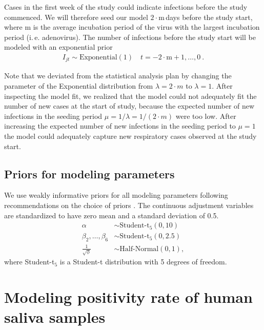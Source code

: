 \documentclass[fleqn,11pt]{wlscirep_supp}
\newcommand\ie{i.\,e.\xspace}
\begin{document}
Cases in the first week of the study could indicate infections before the study commenced. We will therefore seed our model $2 \cdot \text{m}\,$days before the study start, where $\text{m}$ is the average incubation period of the virus with the largest incubation period (\ie adenovirus). The number of infections before the study start will be modeled with an exponential prior
\begin{align*}
    I_{jt} \sim \text{Exponential}(1) \quad t = -2\cdot\text{m}+1, \dots, 0~. 
\end{align*}

Note that we deviated from the statistical analysis plan by changing the parameter of the Exponential distribution from $\lambda = 2 \cdot m$ to $\lambda = 1$. After inspecting the model fit, we realized that the model could not adequately fit the number of new cases at the start of study, because the expected number of new infections in the seeding period $\mu = 1 / \lambda = 1 / (2 \cdot m)$ were too low. After increasing the expected number of new infections in the seeding period to $\mu = 1$ the model could adequately capture new respiratory cases observed at the study start.

\subsection{Priors for modeling parameters}

We use weakly informative priors for all modeling parameters following recommendations on the choice of priors \cite{Gelman2008StatMed,Gelman2008StatAnnals,Gelman2020RegOther,Stan2020Priors,Gabry2023Priors}. The continuous adjustment variables are standardized to have zero mean and a standard deviation of 0.5. 
\begin{align*}
    \alpha &\sim \text{Student-t}_5(0, 10) \\
    \beta_2, \dots, \beta_6 &\sim \text{Student-t}_5(0, 2.5) \\
    \frac{1}{\sqrt{\phi}} &\sim \text{Half-Normal}(0,1),
\end{align*}
where Student-t$_5$ is a Student-t distribution with 5 degrees of freedom. 

\clearpage

\section{Modeling positivity rate of human saliva samples}\label{sec:multinomial-model}
\end{document}
